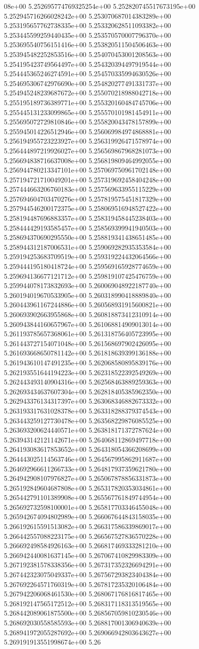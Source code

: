 08e+00	5.252695774769325254e+00	5.252820745517673195e+00	5.252945716266028242e+00	5.253070687014383289e+00	5.253195657762738335e+00	5.253320628511093382e+00	5.253445599259440435e+00	5.253570570007796370e+00	5.253695540756151416e+00	5.253820511504506463e+00	5.253945482252853516e+00	5.254070453001208563e+00	5.254195423749564497e+00	5.254320394497919544e+00	5.254445365246274591e+00	5.254570335994630526e+00	5.254695306742976690e+00	5.254820277491331737e+00	5.254945248239687672e+00	5.255070218988042718e+00	5.255195189736389771e+00	5.255320160484745706e+00	5.255445131233099865e+00	5.255570101981454911e+00	5.255695072729810846e+00	5.255820043478157899e+00	5.255945014226512946e+00	5.256069984974868881e+00	5.256194955723223927e+00	5.256319926471578974e+00	5.256444897219926027e+00	5.256569867968281073e+00	5.256694838716637008e+00	5.256819809464992055e+00	5.256944780213347101e+00	5.257069750961702148e+00	5.257194721710049201e+00	5.257319692458404248e+00	5.257444663206760183e+00	5.257569633955115229e+00	5.257694604703470276e+00	5.257819575451817329e+00	5.257944546200172375e+00	5.258069516948527422e+00	5.258194487696883357e+00	5.258319458445238403e+00	5.258444429193585457e+00	5.258569399941940503e+00	5.258694370690295550e+00	5.258819341438651485e+00	5.258944312187006531e+00	5.259069282935353584e+00	5.259194253683709519e+00	5.259319224432064566e+00	5.259444195180418724e+00	5.259569165928774659e+00	5.259694136677121712e+00	5.259819107425476759e+00	5.259944078173832693e+00	5.260069048922187740e+00	5.260194019670533905e+00	5.260318990418889840e+00	5.260443961167244886e+00	5.260568931915600821e+00	5.260693902663955868e+00	5.260818873412310914e+00	5.260943844160657967e+00	5.261068814909013014e+00	5.261193785657368061e+00	5.261318756405723995e+00	5.261443727154071048e+00	5.261568697902426095e+00	5.261693668650781142e+00	5.261818639399136188e+00	5.261943610147491235e+00	5.262068580895839176e+00	5.262193551644194223e+00	5.262318522392549269e+00	5.262443493140904316e+00	5.262568463889259363e+00	5.262693434637607304e+00	5.262818405385962350e+00	5.262943376134317397e+00	5.263068346882673332e+00	5.263193317631028378e+00	5.263318288379374543e+00	5.263443259127730478e+00	5.263568229876085525e+00	5.263693200624440571e+00	5.263818171372787624e+00	5.263943142121142671e+00	5.264068112869497718e+00	5.264193083617853652e+00	5.264318054366208699e+00	5.264443025114563746e+00	5.264567995862911687e+00	5.264692966611266733e+00	5.264817937359621780e+00	5.264942908107976827e+00	5.265067878856331873e+00	5.265192849604687808e+00	5.265317820353034861e+00	5.265442791101389908e+00	5.265567761849744954e+00	5.265692732598100001e+00	5.265817703346455048e+00	5.265942674094802989e+00	5.266067644843158035e+00	5.266192615591513082e+00	5.266317586339869017e+00	5.266442557088223175e+00	5.266567527836570228e+00	5.266692498584926163e+00	5.266817469333281210e+00	5.266942440081637145e+00	5.267067410829983309e+00	5.267192381578338356e+00	5.267317352326694291e+00	5.267442323075049337e+00	5.267567293823404384e+00	5.267692264571760319e+00	5.267817235320106484e+00	5.267942206068461530e+00	5.268067176816817465e+00	5.268192147565172512e+00	5.268317118313519565e+00	5.268442089061875500e+00	5.268567059810230546e+00	5.268692030558585593e+00	5.268817001306940639e+00	5.268941972055287692e+00	5.269066942803643627e+00	5.269191913551998674e+00	5.26